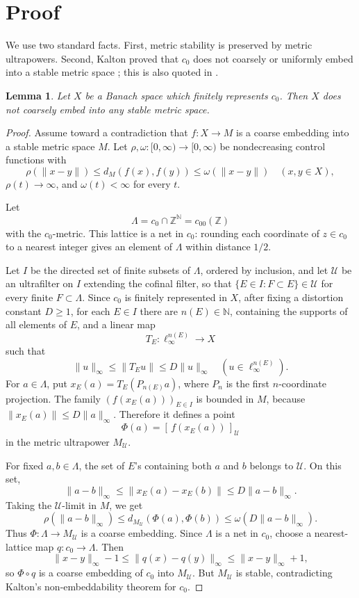 \documentclass[11pt]{article}
\newtheorem{lemma}{Lemma}
\newcommand{\N}{\mathbb N}
\newcommand{\Z}{\mathbb Z}
\newcommand{\co}{c_0}
\begin{document}
\section*{Proof}

We use two standard facts.  First, metric stability is preserved by metric
ultrapowers.  Second, Kalton proved that \(c_0\) does not coarsely or uniformly
embed into a stable metric space \cite{Kalton2007}; this is also quoted in
\cite[p. 3]{BragaSwift}.

\begin{lemma}\label{lem:finitely-c0}
Let \(X\) be a Banach space which finitely represents \(c_0\).  Then \(X\) does
not coarsely embed into any stable metric space.
\end{lemma}

\begin{proof}
Assume toward a contradiction that \(f:X\to M\) is a coarse embedding into a
stable metric space \(M\).  Let \(\rho,\omega:[0,\infty)\to[0,\infty)\) be
nondecreasing control functions with
\[
  \rho(\|x-y\|)\le d_M(f(x),f(y))\le \omega(\|x-y\|)
  \quad (x,y\in X),
\]
\(\rho(t)\to\infty\), and \(\omega(t)<\infty\) for every \(t\).

Let
\[
  \Lambda=\co\cap\Z^\N=c_{00}(\Z)
\]
with the \(c_0\)-metric.  This lattice is a net in \(c_0\): rounding each
coordinate of \(z\in c_0\) to a nearest integer gives an element of \(\Lambda\)
within distance \(1/2\).

Let \(I\) be the directed set of finite subsets of \(\Lambda\), ordered by
inclusion, and let \(\mathcal U\) be an ultrafilter on \(I\) extending the
cofinal filter, so that \(\{E\in I:F\subset E\}\in\mathcal U\) for every finite
\(F\subset\Lambda\).  Since \(c_0\) is finitely represented in \(X\), after
fixing a distortion constant \(D\ge1\), for each \(E\in I\) there are
\(n(E)\in\N\), containing the supports of all elements of \(E\), and a linear
map
\[
  T_E:\ell_\infty^{n(E)}\longrightarrow X
\]
such that
\[
  \|u\|_\infty\le \|T_Eu\|\le D\|u\|_\infty
  \quad (u\in\ell_\infty^{n(E)}).
\]
For \(a\in\Lambda\), put \(x_E(a)=T_E(P_{n(E)}a)\), where \(P_n\) is the first
\(n\)-coordinate projection.  The family \((f(x_E(a)))_{E\in I}\) is bounded in
\(M\), because \(\|x_E(a)\|\le D\|a\|_\infty\).  Therefore it defines a point
\[
  \Phi(a)=[\,f(x_E(a))\,]_{\mathcal U}
\]
in the metric ultrapower \(M_{\mathcal U}\).

For fixed \(a,b\in\Lambda\), the set of \(E\)'s containing both \(a\) and \(b\)
belongs to \(\mathcal U\).  On this set,
\[
  \|a-b\|_\infty
  \le \|x_E(a)-x_E(b)\|
  \le D\|a-b\|_\infty .
\]
Taking the \(\mathcal U\)-limit in \(M\), we get
\[
  \rho(\|a-b\|_\infty)
  \le d_{M_{\mathcal U}}(\Phi(a),\Phi(b))
  \le \omega(D\|a-b\|_\infty).
\]
Thus \(\Phi:\Lambda\to M_{\mathcal U}\) is a coarse embedding.  Since
\(\Lambda\) is a net in \(c_0\), choose a nearest-lattice map
\(q:c_0\to\Lambda\).  Then
\[
  \|x-y\|_\infty-1
  \le \|q(x)-q(y)\|_\infty
  \le \|x-y\|_\infty+1,
\]
so \(\Phi\circ q\) is a coarse embedding of \(c_0\) into \(M_{\mathcal U}\).
But \(M_{\mathcal U}\) is stable, contradicting Kalton's non-embeddability
theorem for \(c_0\).
\end{proof}
\end{document}
